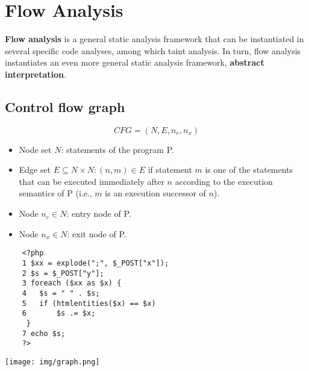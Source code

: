 \documentclass[a4paper, 10pt, titlepage]{article}
\begin{document}
\newpage
\section{Flow Analysis}
\textbf{Flow analysis} is a general static analysis framework that can be instantiated in several specific code analyses, among which taint analysis. In turn, flow analysis instantiates an even more general static analysis framework, \textbf{abstract interpretation}. 

\subsection{Control flow graph}
$$CFG = (N, E, n_e, n_x)$$
\begin{itemize}
\item Node set $N$: statements of the program P.
\item Edge set $E \subseteq N \times N:(n, m) \in E$ if statement $m$ is one of the statements that can be executed immediately after $n$ according to the execution semantics of P (i.e., $m$ is an execution successor of $n$).
\item Node $n_e \in N$: entry node of P.
\item Node $n_x \in N$: exit node of P.
\end{itemize}
\begin{minipage}{0.6\textwidth}
\begin{lstlisting}
	<?php
	1 $xx = explode(";", $_POST["x"]);
	2 $s = $_POST["y"];
	3 foreach ($xx as $x) {
	4	$s = " " . $s;
	5	if (htmlentities($x) == $x)
	6		$s .= $x;
 	 }
	7 echo $s;
	?>
\end{lstlisting}
\end{minipage}
\begin{minipage}{0.35\textwidth}
\texttt{[image: img/graph.png]}
\end{minipage}
\end{document}
